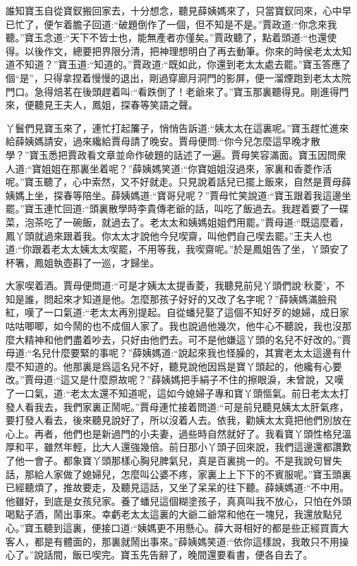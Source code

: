\begin{parag}
\end{parag}


\begin{parag}
    誰知寶玉自從寶釵搬回家去，十分想念，聽見薛姨媽來了，只當寶釵同來，心中早已忙了，便乍着膽子回道:“破題倒作了一個，但不知是不是。”賈政道:“你念來我聽。”寶玉念道:“天下不皆士也，能無產者亦僅矣。”賈政聽了，點着頭道:“也還使得。以後作文，總要把界限分清，把神理想明白了再去動筆。你來的時侯老太太知道不知道？”寶玉道:“知道的。”賈政道:“既如此，你還到老太太處去罷。”寶玉答應了個“是”，只得拿捏着慢慢的退出，剛過穿廊月洞門的影屏，便一溜煙跑到老太太院門口。急得焙茗在後頭趕着叫:“看跌倒了！老爺來了。”寶玉那裏聽得見。剛進得門來，便聽見王夫人，鳳姐，探春等笑語之聲。
\end{parag}


\begin{parag}
    丫鬟們見寶玉來了，連忙打起簾子，悄悄告訴道:“姨太太在這裏呢。”寶玉趕忙進來給薛姨媽請安，過來纔給賈母請了晚安。賈母便問:“你今兒怎麼這早晚才散學？”寶玉悉把賈政看文章並命作破題的話述了一遍。賈母笑容滿面。寶玉因問衆人道:“寶姐姐在那裏坐着呢？”薛姨媽笑道:“你寶姐姐沒過來，家裏和香菱作活呢。”寶玉聽了，心中索然，又不好就走。只見說着話兒已擺上飯來，自然是賈母薛姨媽上坐，探春等陪坐。薛姨媽道:“寶哥兒呢？”賈母忙笑說道:“寶玉跟着我這邊坐罷。”寶玉連忙回道:“頭裏散學時李貴傳老爺的話，叫吃了飯過去。我趕着要了一碟菜，泡茶吃了一碗飯，就過去了。老太太和姨媽姐姐們用罷。”賈母道:“既這麼着，鳳丫頭就過來跟着我。你太太才說他今兒喫齋，叫他們自己喫去罷。”王夫人也道:“你跟着老太太姨太太喫罷，不用等我，我喫齋呢。”於是鳳姐告了坐，丫頭安了杯箸，鳳姐執壺斟了一巡，才歸坐。
\end{parag}


\begin{parag}
    大家喫着酒。賈母便問道:“可是才姨太太提香菱，我聽見前兒丫頭們說‘秋菱’，不知是誰，問起來才知道是他。怎麼那孩子好好的又改了名字呢？”薛姨媽滿臉飛紅，嘆了一口氣道:“老太太再別提起。自從蟠兒娶了這個不知好歹的媳婦，成日家咕咕唧唧，如今鬧的也不成個人家了。我也說過他幾次，他牛心不聽說，我也沒那麼大精神和他們盡着吵去，只好由他們去。可不是他嫌這丫頭的名兒不好改的。”賈母道:“名兒什麼要緊的事呢？”薛姨媽道:“說起來我也怪臊的，其實老太太這邊有什麼不知道的。他那裏是爲這名兒不好，聽見說他因爲是寶丫頭起的，他纔有心要改。”賈母道:“這又是什麼原故呢？”薛姨媽把手絹子不住的擦眼淚，未曾說，又嘆了一口氣，道:“老太太還不知道呢，這如今媳婦子專和寶丫頭慪氣。前日老太太打發人看我去，我們家裏正鬧呢。”賈母連忙接着問道:“可是前兒聽見姨太太肝氣疼，要打發人看去，後來聽見說好了，所以沒着人去。依我，勸姨太太竟把他們別放在心上。再者，他們也是新過門的小夫妻，過些時自然就好了。我看寶丫頭性格兒溫厚和平，雖然年輕，比大人還強幾倍。前日那小丫頭子回來說，我們這邊還都讚歎了他一會子。都象寶丫頭那樣心胸兒脾氣兒，真是百裏挑一的。不是我說句冒失話，那給人家做了媳婦兒，怎麼叫公婆不疼，家裏上上下下的不賓服呢。”寶玉頭裏已經聽煩了，推故要走，及聽見這話，又坐了呆呆的往下聽。薛姨媽道:“不中用。他雖好，到底是女孩兒家。養了蟠兒這個糊塗孩子，真真叫我不放心，只怕在外頭喝點子酒，鬧出事來。幸虧老太太這裏的大爺二爺常和他在一塊兒，我還放點兒心。”寶玉聽到這裏，便接口道:“姨媽更不用懸心。薛大哥相好的都是些正經買賣大客人，都是有體面的，那裏就鬧出事來。”薛姨媽笑道:“依你這樣說，我敢只不用操心了。”說話間，飯已喫完。寶玉先告辭了，晚間還要看書，便各自去了。
\end{parag}


